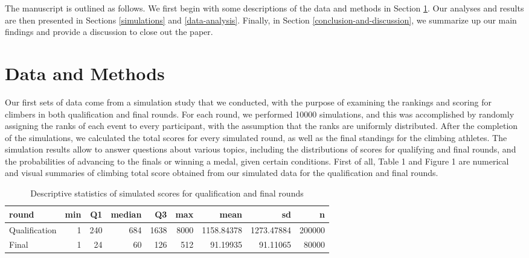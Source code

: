 \documentclass[12pt]{article}
\begin{document}
The manuscript is outlined as follows. We first begin with some
descriptions of the data and methods in Section \ref{data-and-methods}.
Our analyses and results are then presented in Sections
\ref{simulations} and \ref{data-analysis}. Finally, in Section
\ref{conclusion-and-discussion}, we summarize up our main findings and
provide a discussion to close out the paper.

\hypertarget{data-and-methods}{%
\section{Data and Methods}\label{data-and-methods}}

Our first sets of data come from a simulation study that we conducted,
with the purpose of examining the rankings and scoring for climbers in
both qualification and final rounds. For each round, we performed 10000
simulations, and this was accomplished by randomly assigning the ranks
of each event to every participant, with the assumption that the ranks
are uniformly distributed. After the completion of the simulations, we
calculated the total scores for every simulated round, as well as the
final standings for the climbing athletes. The simulation results allow
to answer questions about various topics, including the distributions of
scores for qualifying and final rounds, and the probabilities of
advancing to the finals or winning a medal, given certain conditions.
First of all, Table 1 and Figure 1 are numerical and visual summaries of
climbing total score obtained from our simulated data for the
qualification and final rounds.

\begin{table}[H]

\caption{\label{tab:unnamed-chunk-4}Descriptive statistics of simulated scores for qualification and final rounds}
\centering
\begin{tabular}[t]{lrrrrrrrr}
\toprule
round & min & Q1 & median & Q3 & max & mean & sd & n\\
\midrule
Qualification & 1 & 240 & 684 & 1638 & 8000 & 1158.84378 & 1273.47884 & 200000\\
Final & 1 & 24 & 60 & 126 & 512 & 91.19935 & 91.11065 & 80000\\
\bottomrule
\end{tabular}
\end{table}
\end{document}
